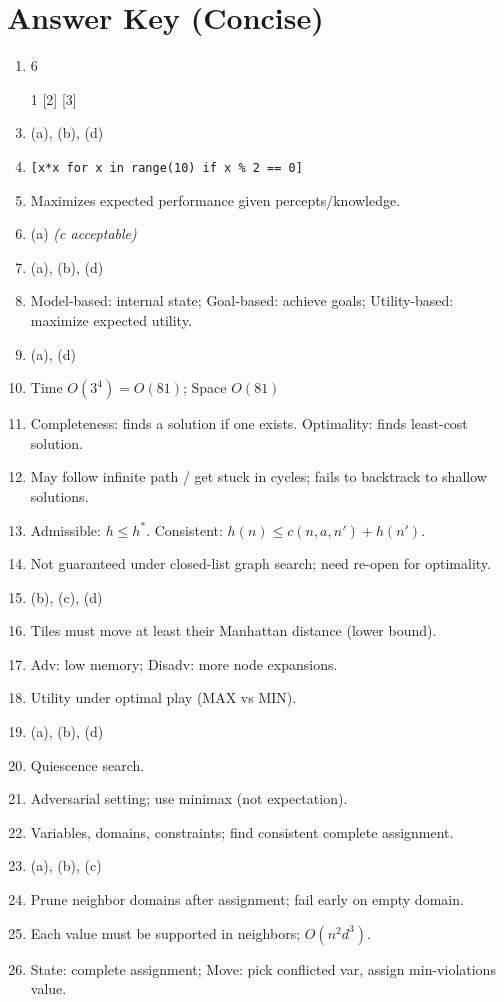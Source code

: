 \documentclass[11pt]{article}
\begin{document}
\section*{Answer Key (Concise)}
\small
\begin{enumerate}[left=0em,itemsep=0.25em]
\item 6
\item [1] [2] [3]
\item (a), (b), (d)
\item \verb|[x*x for x in range(10) if x % 2 == 0]|
\item Maximizes expected performance given percepts/knowledge.
\item (a) \textit{(c acceptable)}
\item (a), (b), (d)
\item Model-based: internal state; Goal-based: achieve goals; Utility-based: maximize expected utility.
\item (a), (d)
\item Time $O(3^4)=O(81)$; Space $O(81)$
\item Completeness: finds a solution if one exists. Optimality: finds least-cost solution.
\item May follow infinite path / get stuck in cycles; fails to backtrack to shallow solutions.
\item Admissible: $h\le h^*$. Consistent: $h(n)\le c(n,a,n')+h(n')$.
\item Not guaranteed under closed-list graph search; need re-open for optimality.
\item (b), (c), (d)
\item Tiles must move at least their Manhattan distance (lower bound).
\item Adv: low memory; Disadv: more node expansions.
\item Utility under optimal play (MAX vs MIN).
\item (a), (b), (d)
\item Quiescence search.
\item Adversarial setting; use minimax (not expectation).
\item Variables, domains, constraints; find consistent complete assignment.
\item (a), (b), (c)
\item Prune neighbor domains after assignment; fail early on empty domain.
\item Each value must be supported in neighbors; $O(n^2 d^3)$.
\item State: complete assignment; Move: pick conflicted var, assign min-violations value.

\end{enumerate}
\end{document}
